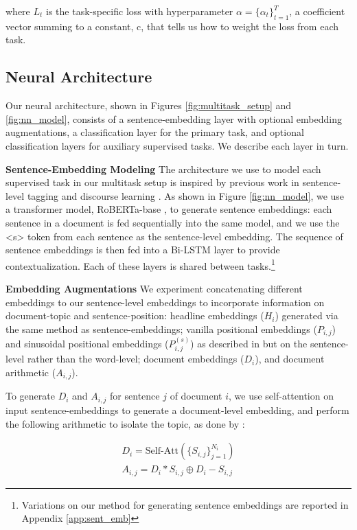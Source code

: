 \documentclass[11pt]{article}
\begin{document}
\noindent where $L_t$ is the task-specific loss with hyperparameter $\alpha = \{\alpha_t\}_{t=1}^T$, a coefficient vector summing to a constant, c, that tells us how to weight the loss from each task.

\subsection{Neural Architecture}
\label{sct:neural_architecture}
Our neural architecture, shown in Figures \ref{fig:multitask_setup} and \ref{fig:nn_model}, consists of a sentence-embedding layer with optional embedding augmentations, a classification layer for the primary task, and optional classification layers for auxiliary supervised tasks. We describe each layer in turn.

\noindent\textbf{Sentence-Embedding Modeling}
The architecture we use to model each supervised task in our multitask setup is inspired by previous work in sentence-level tagging and discourse learning \cite{choubey-etal-2020-discourse,li2019discourse}. As shown in Figure \ref{fig:nn_model}, we use a transformer model, RoBERTa-base \cite{liu2019roberta}, to generate sentence embeddings: each sentence in a document is fed sequentially into the same model, and we use the <s> token from each sentence as the sentence-level embedding. The sequence of sentence embeddings is then fed into a Bi-LSTM layer to provide contextualization. Each of these layers is shared between tasks.\footnote{Variations on our method for generating sentence embeddings are reported in Appendix \ref{app:sent_emb}}

\noindent\textbf{Embedding Augmentations}
We experiment concatenating different embeddings to our sentence-level embeddings to incorporate information on document-topic and sentence-position: headline embeddings ($H_i$) generated via the same method as sentence-embeddings; vanilla positional embeddings ($P_{i, j}$) and sinusoidal positional embeddings ($P_{i, j}^{(s)}$) as described in \citet{vaswani2017attention} but on the sentence-level rather than the word-level; document embeddings ($D_i$), and document arithmetic ($A_{i, j}$). 

To generate $D_i$ and $A_{i, j}$ for sentence $j$ of document $i$, we use self-attention on input sentence-embeddings to generate a document-level embedding, and perform the following arithmetic to isolate the topic, as done by \citet{choubey-etal-2020-discourse}:

\begin{gather}
    D_i = \text{Self-Att}(\{S_{i, j}\}_{j=1}^{N_i}) \\
    A_{i, j} = D_i * S_{i, j} \oplus D_i - S_{i, j}
\end{gather}
\end{document}
